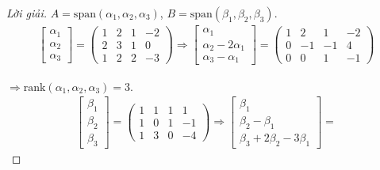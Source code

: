 \documentclass[class=linearalgebra,crop=false]{standalone}
\begin{document}
\begin{proof}[Lời giải]$A = \text{span}(\alpha_{1},\alpha_{2},\alpha_{3})$, $B = \text{span}(\beta_{1},\beta_{2},\beta_{3})$.
    \begin{align*}
        \begin{bmatrix}
            \alpha_{1} \\
            \alpha_{2} \\
            \alpha_{3}
        \end{bmatrix}=
        \begin{pmatrix}
            1 & 2 & 1 & -2 \\
            2 & 3 & 1 & 0  \\
            1 & 2 & 2 & -3
        \end{pmatrix}
        \Longrightarrow
        \begin{bmatrix}
            \alpha_{1}               \\
            \alpha_{2} - 2\alpha_{1} \\
            \alpha_{3} - \alpha_{1}
        \end{bmatrix}=
        \begin{pmatrix}
            1 & 2  & 1  & -2 \\
            0 & -1 & -1 & 4  \\
            0 & 0  & 1  & -1
        \end{pmatrix}
    \end{align*}
    \par $\Rightarrow\text{rank}(\alpha_{1}, \alpha_{2}, \alpha_{3}) = 3$.
    \begin{align*}
        \begin{bmatrix}
            \beta_{1} \\
            \beta_{2} \\
            \beta_{3}
        \end{bmatrix}=
        \begin{pmatrix}
            1 & 1 & 1 & 1  \\
            1 & 0 & 1 & -1 \\
            1 & 3 & 0 & -4
        \end{pmatrix}
        \Longrightarrow
        \begin{bmatrix}
            \beta_{1}             \\
            \beta_{2} - \beta_{1} \\
            \beta_{3} + 2\beta_{2} - 3\beta_{1}
        \end{bmatrix}=

\end{align*}
\end{proof}
\end{document}
